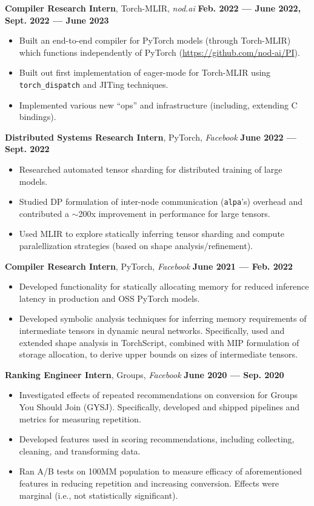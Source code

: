 \documentclass[11pt,letterpaper,roman,colorlinks,linkcolor=blue]{moderncv}
\begin{document}
\textbf{Compiler Research Intern}, Torch-MLIR, \emph{nod.ai}
\hfill \textbf{Feb. 2022 --- June 2022, Sept. 2022 --- June 2023}
\begin{itemize}
\item Built an end-to-end compiler for PyTorch models (through Torch-MLIR) which functions independently of PyTorch (\href{https://github.com/nod-ai/PI}{https://github.com/nod-ai/PI}).
\item Built out first implementation of eager-mode for Torch-MLIR using \texttt{torch\_dispatch} and JITing techniques.
\item Implemented various new ``ops'' and infrastructure (including, extending C bindings).
\end{itemize}

\textbf{Distributed Systems Research Intern}, PyTorch, \emph{Facebook}
\hfill \textbf{June 2022 --- Sept. 2022}
\begin{itemize}
\item Researched automated tensor sharding for distributed training of large models.
\item Studied DP formulation of inter-node communication (\texttt{alpa}'s) overhead and contributed a $\sim$200x improvement in performance for large tensors.
\item Used MLIR to explore statically inferring tensor sharding and compute paralellization strategies (based on shape analysis/refinement).
\end{itemize}

\textbf{Compiler Research Intern}, PyTorch, \emph{Facebook}
\hfill \textbf{June 2021 --- Feb. 2022}
\begin{itemize}
\item Developed functionality for statically allocating memory for reduced inference latency in production and OSS PyTorch models.
\item Developed symbolic analysis techniques for inferring memory requirements of intermediate tensors in dynamic neural networks. Specifically, used and extended shape analysis in TorchScript, combined with MIP formulation of storage allocation, to derive upper bounds on sizes of intermediate tensors.  
\end{itemize}

\textbf{Ranking Engineer Intern}, Groups, \emph{Facebook}
\hfill \textbf{June 2020 --- Sep. 2020}
\begin{itemize}
\item Investigated effects of repeated recommendations on conversion for Groups You Should Join (GYSJ). Specifically, developed and shipped pipelines and metrics for measuring repetition. 
\item Developed features used in scoring recommendations, including collecting, cleaning, and transforming data.
\item Ran A/B tests on 100MM population to measure efficacy of aforementioned features in reducing repetition and increasing conversion. Effects were marginal (i.e., not statistically significant).
\end{itemize}
\end{document}
